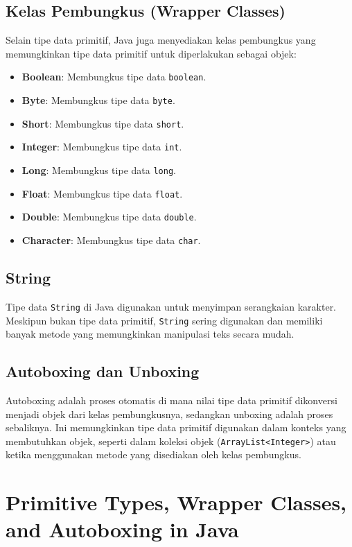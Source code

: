 \subsection{Kelas Pembungkus (Wrapper Classes)}
Selain tipe data primitif, Java juga menyediakan kelas pembungkus yang memungkinkan tipe data primitif untuk diperlakukan sebagai objek:

\begin{itemize}
	\item \textbf{Boolean}: Membungkus tipe data \texttt{boolean}.
	\item \textbf{Byte}: Membungkus tipe data \texttt{byte}.
	\item \textbf{Short}: Membungkus tipe data \texttt{short}.
	\item \textbf{Integer}: Membungkus tipe data \texttt{int}.
	\item \textbf{Long}: Membungkus tipe data \texttt{long}.
	\item \textbf{Float}: Membungkus tipe data \texttt{float}.
	\item \textbf{Double}: Membungkus tipe data \texttt{double}.
	\item \textbf{Character}: Membungkus tipe data \texttt{char}.
\end{itemize}

\subsection{String}
Tipe data \texttt{String} di Java digunakan untuk menyimpan serangkaian karakter. Meskipun bukan tipe data primitif, \texttt{String} sering digunakan dan memiliki banyak metode yang memungkinkan manipulasi teks secara mudah.

\subsection{Autoboxing dan Unboxing}
Autoboxing adalah proses otomatis di mana nilai tipe data primitif dikonversi menjadi objek dari kelas pembungkusnya, sedangkan unboxing adalah proses sebaliknya. Ini memungkinkan tipe data primitif digunakan dalam konteks yang membutuhkan objek, seperti dalam koleksi objek (\texttt{ArrayList<Integer>}) atau ketika menggunakan metode yang disediakan oleh kelas pembungkus.

\section{Primitive Types, Wrapper Classes, and Autoboxing in Java}


